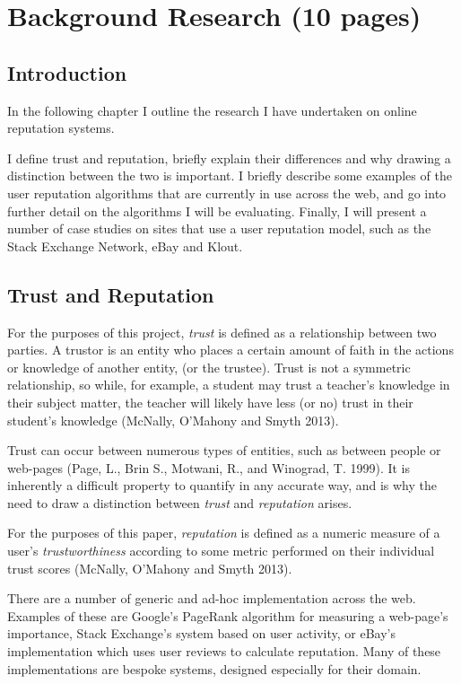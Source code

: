 \documentclass[]{final_report}
\begin{document}
\chapter{Background Research (10 pages)}

\section{Introduction}

In the following chapter I outline the research I have undertaken on online reputation systems.

I define trust and reputation, briefly explain their differences and why drawing a distinction between the two is important. I  briefly describe some examples of the user reputation algorithms that are currently in use across the web, and go into further detail on the algorithms I will be evaluating. Finally,  I will present a number of case studies on sites that use a user reputation model, such as the Stack Exchange Network, eBay and Klout.


\section{Trust and Reputation}

For the purposes of this project, \textsl{trust} is defined as a relationship between two parties. A trustor is an entity who places a certain amount of faith in the actions or knowledge of another entity, (or the trustee). Trust is not a symmetric relationship, so while, for example, a student may trust a teacher's knowledge in their subject matter, the teacher will likely have less (or no) trust in their student's knowledge  (McNally, O'Mahony and Smyth 2013).

Trust can occur between numerous types of entities, such as between people or web-pages (Page, L., Brin S., Motwani, R., and Winograd, T. 1999). It is inherently a difficult property to quantify in any accurate way, and is why the need to draw a distinction between \textsl{trust} and \textsl{reputation} arises.

For the purposes of this paper, \textsl{reputation} is defined as a numeric measure of a user's \textsl{trustworthiness} according to some metric performed on their individual trust scores (McNally, O'Mahony and Smyth 2013).

There are a number of generic and ad-hoc implementation across the web. Examples of these are Google's PageRank algorithm for measuring a web-page's importance, Stack Exchange's system based on user activity, or eBay's implementation which uses user reviews to calculate reputation. Many of these implementations are bespoke systems, designed especially for their domain.
\end{document}

